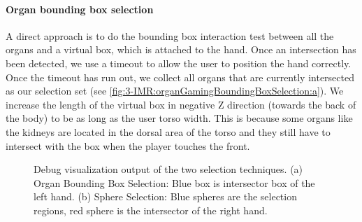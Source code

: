 \paragraph{Organ bounding box selection}
A direct approach is to do the bounding box interaction test between all the organs and a virtual box, which is attached to the hand. 
Once an intersection has been detected, we use a timeout to allow the user to position the hand correctly. Once the timeout has run out, we collect all organs that are currently intersected as our selection set (see \figurename{\ref{fig:3-IMR:organGamingBoundingBoxSelection:a}}).
We increase the length of the virtual box in negative Z direction (towards the back of the body) to be as long as the user torso width. This is because some organs like the kidneys are located in the dorsal area of the torso and they still have to intersect with the box when the player touches the front.

\begin{figure}[htb]
	\centering
	\caption{Debug visualization output of the two selection techniques. (a) Organ Bounding Box Selection: Blue box is intersector box of the left hand. (b) Sphere Selection: Blue spheres are the selection regions, red sphere is the intersector of the right hand.}
	\label{fig:3-IMR:organGamingBoundingBoxSelection}
\end{figure}
